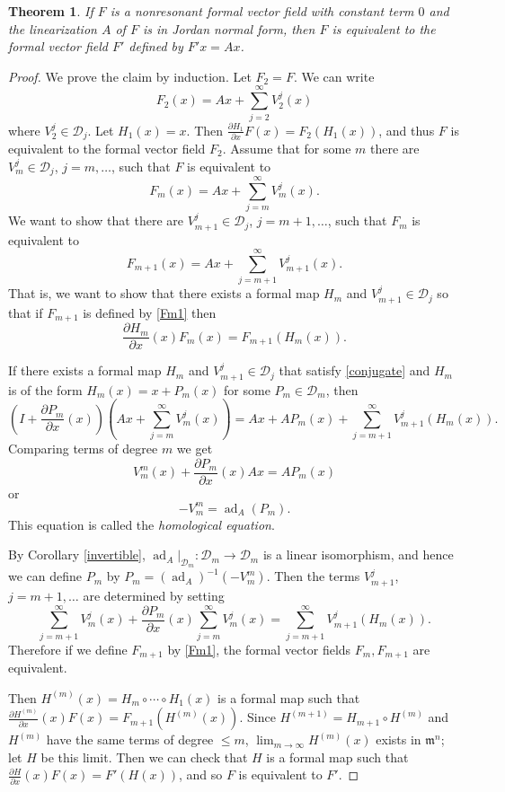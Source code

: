 \documentclass{article}
\newtheorem{theorem}{Theorem}
\newcommand{\ad}{\operatorname{ad}}
\begin{document}
\begin{theorem}
If $F$ is a nonresonant formal vector field with constant term $0$  and the linearization $A$ of $F$ is in Jordan normal form, then $F$ is equivalent to the formal vector field $F'$ defined by $F'x=Ax$.
\end{theorem}
\begin{proof}
We prove the claim by induction.
Let $F_2=F$. We can write
\[
F_2(x)=Ax+\sum_{j=2}^\infty V_2^j(x)
\]
where $V_2^j \in \mathscr{D}_j$. Let $H_1(x)=x$. Then $\frac{\partial H_1}{\partial x} F(x)=F_2(H_1(x))$, and thus $F$ is equivalent to the formal vector field $F_2$. Assume that for some 
$m$ there are $V_m^j \in \mathscr{D}_j$, $j=m,\ldots$, such that $F$ is equivalent to
\[
F_m(x)=Ax+\sum_{j=m}^\infty V_m^j(x).
\]
We want to show that there are $V_{m+1}^j \in \mathscr{D}_j$, $j=m+1,\ldots$, such that $F_m$ is equivalent to
\begin{equation}
\label{Fm1}
F_{m+1}(x)=Ax+\sum_{j=m+1}^\infty V_{m+1}^j(x).
\end{equation}
That is, we want to show that there exists a formal map $H_m$ and
$V_{m+1}^j \in \mathscr{D}_j$ so that if $F_{m+1}$ is defined by \eqref{Fm1} then 
\begin{equation}
\label{conjugate}
\frac{\partial H_m}{\partial x}(x) F_m(x)=F_{m+1}(H_m(x)).
\end{equation}

If there exists a formal map $H_m$ and $V_{m+1}^j \in \mathscr{D}_j$ that satisfy \eqref{conjugate} and
$H_m$ is of the form
$H_m(x)=x+P_m(x)$ for some $P_m \in \mathscr{D}_m$, 
then
\begin{equation}
\label{determing}
(I+\frac{\partial P_m}{\partial x}(x))(Ax+\sum_{j=m}^\infty V^j_m(x))
=Ax+AP_m(x)+\sum_{j=m+1}^\infty V_{m+1}^j(H_m(x)).
\end{equation}
Comparing terms of degree $m$ we get
\[
V^m_m(x)+\frac{\partial P_m}{\partial x}(x)Ax=AP_m(x)
\]
or
\[
-V^m_m=\ad_A(P_m).
\]
This equation is called the {\em homological equation}. 

By Corollary \ref{invertible}, $\ad_A|_{\mathscr{D}_m}:\mathscr{D}_m \to \mathscr{D}_m$ is a linear isomorphism, and hence we can define $P_m$ by
$P_m=(\ad_A)^{-1}(-V^m_m)$. 
Then the terms $V^j_{m+1}$, $j=m+1,\ldots$ are determined by setting
\[
\sum_{j=m+1}^\infty V^j_m(x)
+
\frac{\partial P_m}{\partial x}(x)
\sum_{j=m}^\infty V^j_m(x)
=\sum_{j=m+1}^\infty V_{m+1}^j(H_m(x)).
\]
Therefore if we define $F_{m+1}$ by \eqref{Fm1}, the formal vector fields
$F_m,F_{m+1}$ are equivalent.

Then 
$H^{(m)}(x)=H_m \circ \cdots \circ H_1(x)$ is a formal map such that
$\frac{\partial H^{(m)}}{\partial x}(x) F(x)=F_{m+1}(H^{(m)}(x))$.
Since $H^{(m+1)}=H_{m+1} \circ H^{(m)}$ and $H^{(m)}$ have the same terms of
degree $\leq m$,  $\lim_{m \to \infty} H^{(m)}(x)$ exists in $\mathfrak{m}^n$; let $H$ be this limit. Then
we can check that $H$ is a formal map such that 
$\frac{\partial H}{\partial x}(x) F(x)=F'(H(x))$, and so
$F$ is equivalent to $F'$.
\end{proof}
\end{document}
